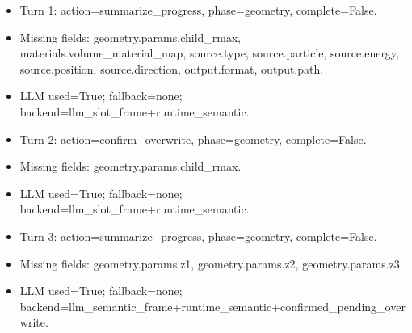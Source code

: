 \documentclass[11pt]{ctexart}
\begin{document}
\begin{itemize}
\item Turn 1: action=summarize\_progress, phase=geometry, complete=False.
\item Missing fields: geometry.params.child\_rmax, materials.volume\_material\_map, source.type, source.particle, source.energy, source.position, source.direction, output.format, output.path.
\item LLM used=True; fallback=none; backend=llm\_slot\_frame+runtime\_semantic.
\item Turn 2: action=confirm\_overwrite, phase=geometry, complete=False.
\item Missing fields: geometry.params.child\_rmax.
\item LLM used=True; fallback=none; backend=llm\_slot\_frame+runtime\_semantic.
\item Turn 3: action=summarize\_progress, phase=geometry, complete=False.
\item Missing fields: geometry.params.z1, geometry.params.z2, geometry.params.z3.
\item LLM used=True; fallback=none; backend=llm\_semantic\_frame+runtime\_semantic+confirmed\_pending\_overwrite.
\end{itemize}
\end{document}
